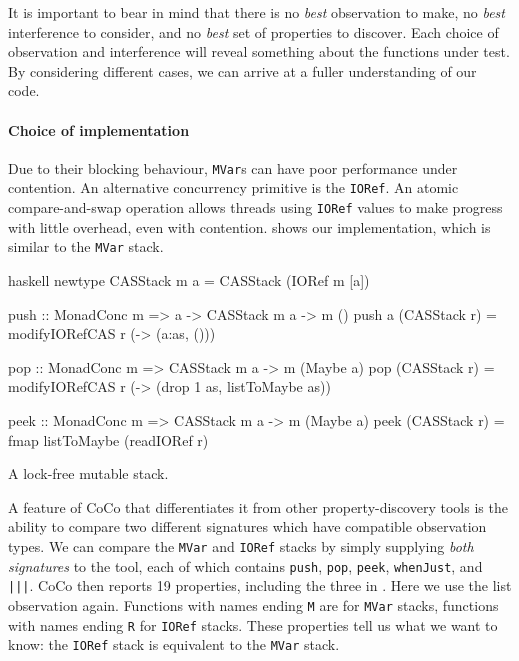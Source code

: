 It is important to bear in mind that there is no \emph{best}
observation to make, no \emph{best} interference to consider, and no
\emph{best} set of properties to discover.  Each choice of observation
and interference will reveal something about the functions under test.
By considering different cases, we can arrive at a fuller
understanding of our code.

\paragraph{Choice of implementation}
Due to their blocking behaviour, \verb|MVar|s can have poor
performance under contention.  An alternative concurrency primitive is
the \verb|IORef|.  An atomic compare-and-swap operation allows threads
using \verb|IORef| values to make progress with little overhead, even
with contention.   shows our implementation, which
is similar to the \verb|MVar| stack.

\begin{listing}
\centering
\begin{cminted}{haskell}
newtype CASStack m a = CASStack (IORef m [a])

push :: MonadConc m => a -> CASStack m a -> m ()
push a (CASStack r) = modifyIORefCAS r (\as -> (a:as, ()))

pop :: MonadConc m => CASStack m a -> m (Maybe a)
pop (CASStack r) = modifyIORefCAS r (\as -> (drop 1 as, listToMaybe as))

peek :: MonadConc m => CASStack m a -> m (Maybe a)
peek (CASStack r) = fmap listToMaybe (readIORef r)
\end{cminted}
\caption{A lock-free mutable stack.}
\label{lst:crefstack}
\end{listing}

A feature of CoCo that differentiates it from other property-discovery
tools is the ability to compare two different signatures which have
compatible observation types.  We can compare the \verb|MVar| and
\verb|IORef| stacks by simply supplying \emph{both signatures} to the
tool, each of which contains \verb|push|, \verb|pop|, \verb|peek|,
\verb|whenJust|, and \verb#|||#.  CoCo then reports 19 properties,
including the three in .  Here we use the list
observation again.  Functions with names ending \verb|M| are for
\verb|MVar| stacks, functions with names ending \verb|R| for
\verb|IORef| stacks.  These properties tell us what we want to know:
the \verb|IORef| stack is equivalent to the \verb|MVar| stack.

